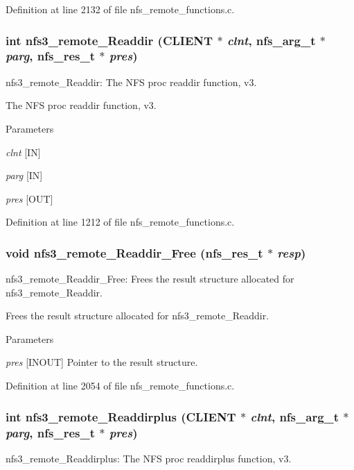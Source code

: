 Definition at line 2132 of file nfs\_\-remote\_\-functions.c.
\subsubsection[{nfs3\_\-remote\_\-Readdir}]{\setlength{\rightskip}{0pt plus 5cm}int nfs3\_\-remote\_\-Readdir (CLIENT $\ast$ {\em clnt}, \/  nfs\_\-arg\_\-t $\ast$ {\em parg}, \/  nfs\_\-res\_\-t $\ast$ {\em pres})}\label{group__NFSprocs_ga0c97a6efdfbb9eb372d7adb68587a846}
nfs3\_\-remote\_\-Readdir: The NFS proc readdir function, v3.

The NFS proc readdir function, v3.


\begin{DoxyParams}{Parameters}
\item[{\em clnt}][IN] \item[{\em parg}][IN] \item[{\em pres}][OUT] \end{DoxyParams}


Definition at line 1212 of file nfs\_\-remote\_\-functions.c.
\subsubsection[{nfs3\_\-remote\_\-Readdir\_\-Free}]{\setlength{\rightskip}{0pt plus 5cm}void nfs3\_\-remote\_\-Readdir\_\-Free (nfs\_\-res\_\-t $\ast$ {\em resp})}\label{group__NFSprocs_gab5b57b9416eb3c1009e1ca4ebd0bc56a}
nfs3\_\-remote\_\-Readdir\_\-Free: Frees the result structure allocated for nfs3\_\-remote\_\-Readdir.

Frees the result structure allocated for nfs3\_\-remote\_\-Readdir.


\begin{DoxyParams}{Parameters}
\item[{\em pres}][INOUT] Pointer to the result structure. \end{DoxyParams}


Definition at line 2054 of file nfs\_\-remote\_\-functions.c.
\subsubsection[{nfs3\_\-remote\_\-Readdirplus}]{\setlength{\rightskip}{0pt plus 5cm}int nfs3\_\-remote\_\-Readdirplus (CLIENT $\ast$ {\em clnt}, \/  nfs\_\-arg\_\-t $\ast$ {\em parg}, \/  nfs\_\-res\_\-t $\ast$ {\em pres})}\label{group__NFSprocs_ga9da731a0753d61a44ac25e9a640ce556}
nfs3\_\-remote\_\-Readdirplus: The NFS proc readdirplus function, v3.

